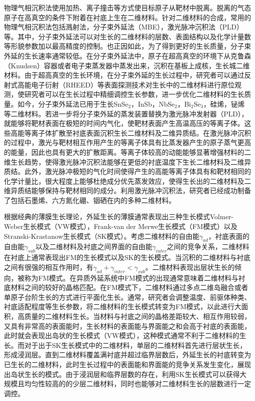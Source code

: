     物理气相沉积法使用加热、离子撞击等方式使目标原子从靶材中脱离。脱离的气态原子在高真空的条件下附着在衬底上生在二维材料。针对二维材料的合成，常用的物理气相沉积法包括溅射法，分子束外延法（MBE），激光脉冲沉积法（PLD）等。其中，分子束外延法可以对生长的二维材料的层数、表面结构以及化学计量数等形貌参数加以最高精度的控制。也正因如此，为了得到更好的生长质量，分子束外延的生长速率通常较低。在分子束外延法中，原子在超高真空的环境下从克鲁森（Knudsen）容器或者电子束蒸发器中蒸发出来，沉积在基板上成核，生长城二维材料。由于超高真空的生长环境，在分子束外延的生长过程中，研究者可以通过反射式高能电子衍射（RHEED）等表面探测技术对生长中的二维材料进行原位观测，使研究者可以在生长过程中精细调控生长参数，进一步优化二维材料的生长质量。如今，分子束外延法已用于生长SnSe$_2$，InSb，NbSe$_2$，Bi$_2$Se$_3$，硅烯，铋烯等二维材料。若进一步将分子束外延的蒸发装置替换为激光脉冲发射器（PLD），就能够将靶材表面在极短的时间内气化，使靶材表面产生高温高压的等离子体。这些高能等离子体扩散至衬底表面沉积生长二维材料及二维异质结。在激光脉冲沉积的过程中，激光与靶材相互作用产生的等离子体具有比蒸发器产生的原子蒸气更高的能量，因此也具有更大的扩散距离。等离子体较高的动能能够显著增强材料的二维生长趋势，使得激光脉冲沉积法能够在更低的衬底温度下生长二维材料及二维异质结。此外，激光脉冲极短的气化时间使得产生的高能等离子体具有和靶材相同的化学计量比，很大程度上能够杜绝成分优先蒸发效应，使得生长出的二维材料及二维异质结能够保持与靶材相同的成分。利用激光脉冲沉积法，研究者已经成功制备了包括石墨烯、六方氮化硼、铟硒在内的多种二维材料。%

    根据经典的薄膜生长理论，外延生长的薄膜通常表现出三种生长模式\chinesecolon Volmer-Weber生长模式（VW模式），Frank-van der Merwe生长模式（FM模式）以及Stranski-Krastanow生长模式（SK模式）。考虑二维材料的自由能$\gamma_{ad}$，衬底表面的自由能$\gamma_{sub}$以及二维材料及衬底之间界面的自由能$\gamma_{inter}$之间的竞争关系，二维材料在衬底上通常表现出FM的生长模式以及SK的生长模式。当沉积的二维材料与衬底之间有很强的相互作用时，有$\gamma_{ad}+\gamma_{inter}<\gamma_{sub}$。二维材料表现出层状生长的倾向，被称为FM模式。在异质外延系统中FM模式的出现通常意味着二维材料与衬底材料之间的较好的晶格匹配。在FM模式下，二维材料通过多点二维岛融合或者单原子台阶生长的方式进行平面化生长。通常，研究者会调整温度、前驱体种类、衬底适配程度等生长参数，将二维材料的生长模式转变为FM模式，以此进行大面积，高质量的二维材料生长。当材料与衬底之间的晶格差距较大、相互作用较弱，又具有非常高的表面能时，生长材料的表面能与界面能之和会高于衬底的表面能，此时就会表现出岛状的生长模式（VW模式），这种模式通常不利于二维材料的生长。而对于出于SK生长模式中的二维材料，单层的二维材料首先进行层状生长，形成浸润层。直到二维材料覆盖满衬底并超过临界层数后，外延生长的衬底转变为已生长的二维材料，此时生长过程中的表面能和界面能的竞争关系发生变化，展现出岛状生长的模式。由于浸润层和临界层数的存在，利用SK生长模式可以获得大规模且均匀性较高的的少层二维材料，同时也能够对二维材料生长的层数进行一定调控。%

